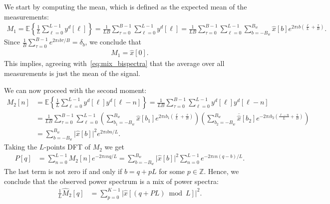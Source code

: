 \documentclass[english,12pt]{article}
\newcommand{\I}{\iota}
\newcommand{\tB}{B_w}
\newcommand{\hx}{\hat{x}}
\newcommand{\E}{\mathbb{E}}
\numberwithin{equation}{section}
\numberwithin{thm}{section} %
\begin{document}
We start by computing the mean, which is defined as the expected mean of the measurements: 
\begin{equation}
\begin{split}
M_1 = \E\left\{ \frac{1}{L} \sum_{\ell=0}^{L-1} y^d[\ell]\right\} =  \frac{1}{LB}\sum_{\tau=0}^{B-1}\sum_{\ell=0}^{L-1} y^d[\ell] =  \frac{1}{LB}\sum_{\tau=0}^{B-1}\sum_{\ell=0}^{L-1}
\sum_{b=-\tB}^{\tB}\hat{x}[b]e^{2\pi\I b \left(\frac{\ell}{L} + \frac{\tau}{B}\right) }.
\end{split}
\end{equation}
Since $\frac{1}{B}\sum_{\tau=0}^{B-1}e^{2\pi\I b \tau/B}=\delta_b$, we conclude that 
\begin{equation} \label{eq:mean}
\begin{split}
M_1 = \hx[0].
\end{split}
\end{equation}
This  implies, agreeing with~\eqref{eq:mix_bispectra} that the average over all measurements is just the mean of the signal.  

We can now proceed with the second moment:
\begin{equation} \label{eq:ps}
\begin{split}
M_2[n] &= \E\left\{\frac{1}{L}\sum_{\ell=0}^{L-1} y^d[\ell]y^d[\ell-n]\right\} =  \frac{1}{LB}\sum_{\tau=0}^{B-1}\sum_{\ell=0}^{L-1} y^d[\ell]y^d[\ell-n] \\ &=  \frac{1}{LB}\sum_{\tau=0}^{B-1}\sum_{\ell=0}^{L-1}
\left(\sum_{b_1=-\tB}^{\tB}\hat{x}[b_1]e^{2\pi\I b_1 \left(\frac{\ell}{L} + \frac{\tau}{B}\right)} \right)
\left(\sum_{b_2=-\tB}^{\tB}\overline{\hx}[b_2]e^{-2\pi\I b_2 \left(\frac{\ell-n}{L} + \frac{\tau}{B}\right)} \right) \\
&=
\sum_{b=-\tB}^{\tB}\vert \hat{x}[b]\vert ^2e^{2\pi\I bn/L}.
\end{split}
\end{equation}
Taking the $L$-points DFT of $M_2$ we get 
\begin{equation}
\begin{split}
P[q] &= \sum_{n=0}^{L-1}M_2[n]e^{-2\pi\I nq/L} = \sum_{b=-\tB}^{\tB}\vert \hat{x}[b]\vert^2\sum_{n=0}^{L-1}e^{-2\pi\I n(q-b)/L}.
\end{split}
\end{equation}
The last term is not zero if and only if $b = q + pL$ for some $p\in\mathbb{Z}$.  Hence, we conclude that the observed power spectrum is a mix of power spectra:
\begin{equation}
\begin{split}
\frac{1}{L}\hat{M}_2[q] &=  \sum_{p=0}^{K-1} \vert \hat{x}[(q+PL)\bmod L]\vert^2.
\end{split}
\end{equation}
\end{document}
